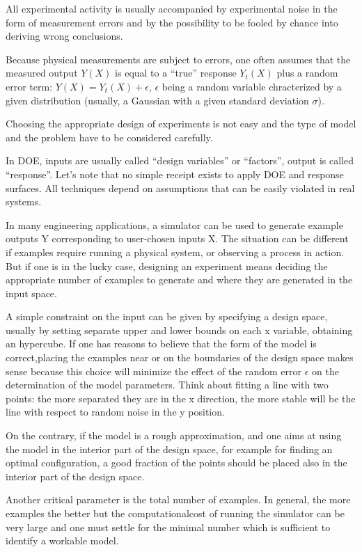 \documentclass[10pt]{article}
\begin{document}
All experimental activity is usually accompanied by experimental noise in the form of measurement errors and by the possibility to be fooled by chance into deriving wrong conclusions.

Because physical measurements are subject to errors, one often assumes that the measured output $ Y(X) $ is equal to a “true” response $ Y_t(X) $ plus a random error term: $ Y(X) = Y_ t(X) + \epsilon $, $ \epsilon $  being a random variable chracterized by a given distribution (usually, a Gaussian with a given standard deviation $ \sigma $).

Choosing the appropriate design of experiments is not easy and the type of model and the problem have to be considered carefully.

In DOE, inputs are usually called “design variables” or “factors”, output is called “response”. Let’s note that no simple receipt exists to apply DOE and response surfaces. All techniques depend on assumptions that can be easily violated in real systems.

In many engineering applications, a simulator can be used to generate example outputs Y corresponding to user-chosen inputs X. The situation can be different if examples require running a physical system, or observing a process in action. 
But if one is in the lucky case, designing an experiment means deciding the appropriate number of examples to generate and where they are generated in the input space. 

A simple constraint on the input can be given by specifying a design space, usually by setting separate upper and lower bounds on each x variable, obtaining an hypercube. If one has reasons to believe that the form of the model is correct,placing the examples near or on the boundaries of the design space makes sense because this choice will minimize the effect of the random error $ \epsilon $ on the determination of the model parameters. Think about fitting a line with two points: the more separated they are in the x direction, the more stable will be the line with respect to random noise in the y position.

On the contrary, if the model is a rough approximation, and one
aims at using the model in the interior part of the design space, for example for finding an optimal configuration, a good fraction of the points should be placed also in the interior part of the design space.

Another critical parameter is the total number of examples. In general, the more examples the better but the computationalcost of running the simulator can be very large and one must settle for the minimal number which is sufficient to identify a workable model.
\end{document}
